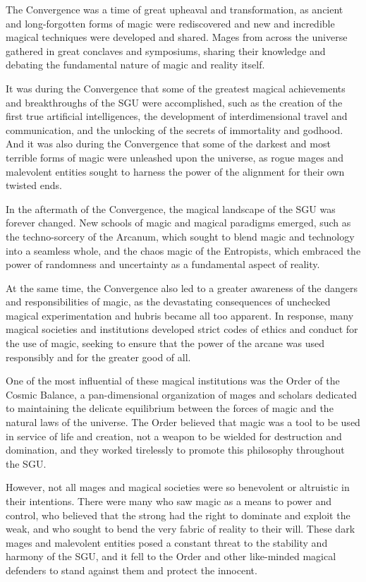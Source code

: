 \documentclass[12pt]{article}
\begin{document}
The Convergence was a time of great upheaval and transformation, as ancient and long-forgotten forms of magic were rediscovered and new and incredible magical techniques were developed and shared. Mages from across the universe gathered in great conclaves and symposiums, sharing their knowledge and debating the fundamental nature of magic and reality itself.

It was during the Convergence that some of the greatest magical achievements and breakthroughs of the SGU were accomplished, such as the creation of the first true artificial intelligences, the development of interdimensional travel and communication, and the unlocking of the secrets of immortality and godhood. And it was also during the Convergence that some of the darkest and most terrible forms of magic were unleashed upon the universe, as rogue mages and malevolent entities sought to harness the power of the alignment for their own twisted ends.

In the aftermath of the Convergence, the magical landscape of the SGU was forever changed. New schools of magic and magical paradigms emerged, such as the techno-sorcery of the Arcanum, which sought to blend magic and technology into a seamless whole, and the chaos magic of the Entropists, which embraced the power of randomness and uncertainty as a fundamental aspect of reality.

At the same time, the Convergence also led to a greater awareness of the dangers and responsibilities of magic, as the devastating consequences of unchecked magical experimentation and hubris became all too apparent. In response, many magical societies and institutions developed strict codes of ethics and conduct for the use of magic, seeking to ensure that the power of the arcane was used responsibly and for the greater good of all.

One of the most influential of these magical institutions was the Order of the Cosmic Balance, a pan-dimensional organization of mages and scholars dedicated to maintaining the delicate equilibrium between the forces of magic and the natural laws of the universe. The Order believed that magic was a tool to be used in service of life and creation, not a weapon to be wielded for destruction and domination, and they worked tirelessly to promote this philosophy throughout the SGU.

However, not all mages and magical societies were so benevolent or altruistic in their intentions. There were many who saw magic as a means to power and control, who believed that the strong had the right to dominate and exploit the weak, and who sought to bend the very fabric of reality to their will. These dark mages and malevolent entities posed a constant threat to the stability and harmony of the SGU, and it fell to the Order and other like-minded magical defenders to stand against them and protect the innocent.
\end{document}
